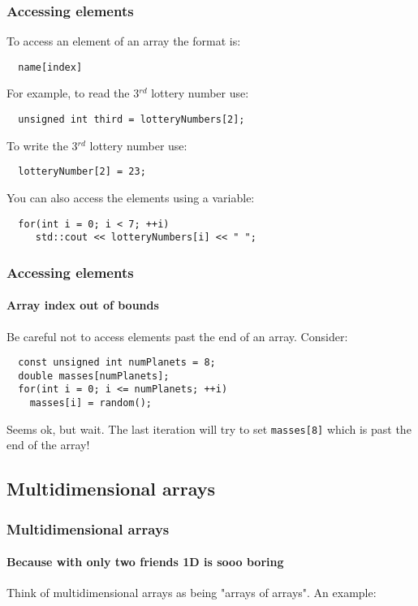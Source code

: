 \documentclass{beamer}
\begin{document}
\begin{frame}[fragile]
  \frametitle{Accessing elements}
  
  To access an element of an array the format is:
  \begin{lstlisting}
  name[index]
  \end{lstlisting}
  \pause
  For example, to read the 3$^{rd}$ lottery number use:
  \begin{lstlisting}
  unsigned int third = lotteryNumbers[2];
  \end{lstlisting}
  \pause
  To write the 3$^{rd}$ lottery number use:
  \begin{lstlisting}
  lotteryNumber[2] = 23;
  \end{lstlisting}
  \pause
  You can also access the elements using a variable:
  \begin{lstlisting}
  for(int i = 0; i < 7; ++i)
     std::cout << lotteryNumbers[i] << " ";
  \end{lstlisting}
\end{frame}

\begin{frame}[fragile]
  \frametitle{Accessing elements}
  \framesubtitle{Array index out of bounds}
    \begin{warnblocke}Be careful not to access elements past the end of an array.  Consider:
    \begin{lstlisting}
  const unsigned int numPlanets = 8;
  double masses[numPlanets];
  for(int i = 0; i <= numPlanets; ++i)
    masses[i] = random();
    \end{lstlisting}
	Seems ok, but wait.  The last iteration will try to set \texttt{masses[8]} which is past the end of the array!
    \end{warnblocke}

\end{frame}

\subsection{Multidimensional arrays}

\begin{frame}[fragile]
  \frametitle{Multidimensional arrays}
  \framesubtitle{Because with only two friends 1D is sooo boring}
  Think of multidimensional arrays as being "arrays of arrays".  An example:
    
  

\end{frame}
\end{document}
